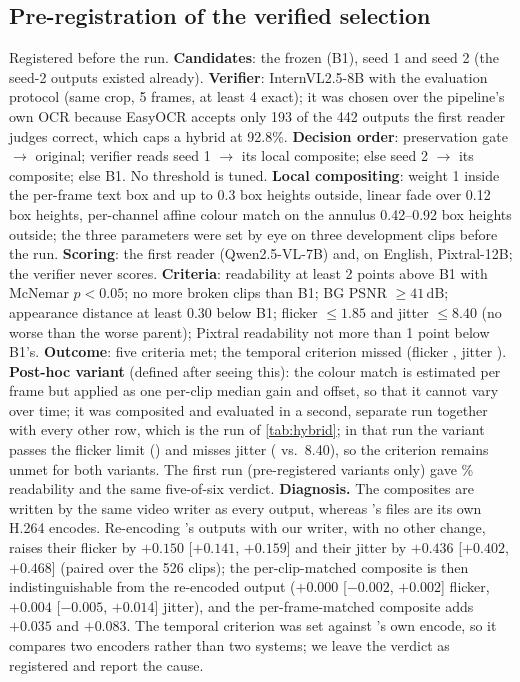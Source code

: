 \subsection{Pre-registration of the verified selection}
\label{sec:supp_prereg_hybrid}
Registered before the run. \textbf{Candidates}: the frozen \method (B1), \steer seed 1 and seed 2 (the seed-2 outputs existed already). \textbf{Verifier}: InternVL2.5-8B with the evaluation protocol (same crop, 5 frames, at least 4 exact); it was chosen over the pipeline's own OCR because EasyOCR accepts only 193 of the 442 \steer outputs the first reader judges correct, which caps a hybrid at 92.8\%. \textbf{Decision order}: preservation gate $\to$ original; verifier reads seed 1 $\to$ its local composite; else seed 2 $\to$ its composite; else B1. No threshold is tuned. \textbf{Local compositing}: weight 1 inside the per-frame text box and up to 0.3 box heights outside, linear fade over 0.12 box heights, per-channel affine colour match on the annulus 0.42--0.92 box heights outside; the three parameters were set by eye on three development clips before the run. \textbf{Scoring}: the first reader (Qwen2.5-VL-7B) and, on English, Pixtral-12B; the verifier never scores. \textbf{Criteria}: readability at least 2 points above B1 with McNemar $p<0.05$; no more broken clips than B1; BG PSNR $\geq 41$\,dB; appearance distance at least 0.30 below B1; flicker $\leq 1.85$ and jitter $\leq 8.40$ (no worse than the worse parent); Pixtral readability not more than 1 point below B1's. \textbf{Outcome}: five criteria met; the temporal criterion missed (flicker \hVFlicker, jitter \hVJitter). \textbf{Post-hoc variant} (defined after seeing this): the colour match is estimated per frame but applied as one per-clip median gain and offset, so that it cannot vary over time; it was composited and evaluated in a second, separate run together with every other row, which is the run of \cref{tab:hybrid}; in that run the variant passes the flicker limit (\hVCFlicker) and misses jitter (\hVCJitter{} vs.\ 8.40), so the criterion remains unmet for both variants. The first run (pre-registered variants only) gave \hVRead\% readability and the same five-of-six verdict. \textbf{Diagnosis.} The composites are written by the same video writer as every \method output, whereas \steer's files are its own H.264 encodes. Re-encoding \steer's outputs with our writer, with no other change, raises their flicker by $+0.150$ [$+0.141$, $+0.159$] and their jitter by $+0.436$ [$+0.402$, $+0.468$] (paired over the 526 clips); the per-clip-matched composite is then indistinguishable from the re-encoded \steer output ($+0.000$ [$-0.002$, $+0.002$] flicker, $+0.004$ [$-0.005$, $+0.014$] jitter), and the per-frame-matched composite adds $+0.035$ and $+0.083$. The temporal criterion was set against \steer's own encode, so it compares two encoders rather than two systems; we leave the verdict as registered and report the cause.


